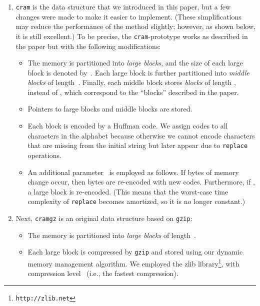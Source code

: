 \documentclass{llncs}
\begin{document}
\begin{enumerate}
\item
\texttt{cram} is the data structure that we introduced in this paper, but
a few changes were made to make it easier to implement.
(These simplifications may reduce the performance of the method slightly;
however, as shown below, it is still excellent.)
To be precise, the \texttt{cram}-prototype works as described in the paper
but with the following modifications:

\smallskip

\begin{itemize}
\item[{\raise0.3pt\hbox{}}]
The memory is partitioned into \emph{large blocks}, and the size of each
large block is denoted by~.
Each large block is further partitioned into \emph{middle blocks} of
length~.
Finally, each middle block stores \emph{blocks} of length
, instead of , 
which correspond to the ``blocks'' described in the paper.

\smallskip
\item[{\raise0.3pt\hbox{}}]
Pointers to large blocks and middle blocks are stored.

\smallskip
\item[{\raise0.3pt\hbox{}}]
Each block is encoded by a Huffman code.
We assign codes to all characters in the alphabet because otherwise we
cannot encode characters that are missing from the initial string but later
appear due to \texttt{replace} operations.

\smallskip
\item[{\raise0.3pt\hbox{}}]
An additional parameter~ is employed as follows.
If  bytes of memory change occur, then  bytes are re-encoded
with new codes.
Furthermore, if , a large block is re-encoded.
(This means that the worst-case time complexity of \texttt{replace}
becomes amortized, so it is no longer constant.)
\end{itemize}

\medskip

\item
Next, \texttt{cramgz} is an original data structure based on \texttt{gzip}:

\smallskip

\begin{itemize}
\item[{\raise0.3pt\hbox{}}]
The memory is partitioned into \emph{large blocks} of length~.

\smallskip
\item[{\raise0.3pt\hbox{}}]
Each large block is compressed by \texttt{gzip} and stored using our
dynamic memory management algorithm.
We employed the zlib library\footnote{\texttt{http://zlib.net}}, with
compression level~ (i.e., the fastest compression).
\end{itemize}
\end{enumerate}
\end{document}
